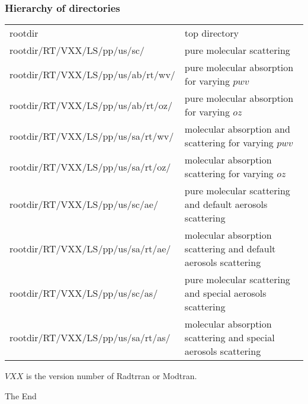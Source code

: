 \documentclass{beamer}
\begin{document}
\begin{frame}
\frametitle{Hierarchy of directories}
\begin{table}
{\tiny
\begin{tabular}{ l l}
  rootdir &  top directory \\
 rootdir/RT/VXX/LS/pp/us/sc/ & pure molecular scattering \\
 rootdir/RT/VXX/LS/pp/us/ab/rt/wv/ & pure molecular absorption for varying $pwv$ \\
 rootdir/RT/VXX/LS/pp/us/ab/rt/oz/ & pure molecular absorption for varying $oz$ \\
 rootdir/RT/VXX/LS/pp/us/sa/rt/wv/ & molecular absorption and scattering for varying $pwv$ \\
 rootdir/RT/VXX/LS/pp/us/sa/rt/oz/ & molecular absorption scattering for varying $oz$ \\
 rootdir/RT/VXX/LS/pp/us/sc/ae/ & pure molecular scattering and default aerosols scattering \\
 rootdir/RT/VXX/LS/pp/us/sa/rt/ae/ & molecular absorption scattering and default aerosols scattering \\
 rootdir/RT/VXX/LS/pp/us/sc/as/ & pure molecular scattering and special aerosols scattering \\
 rootdir/RT/VXX/LS/pp/us/sa/rt/as/ & molecular absorption scattering and special aerosols scattering \\
\end{tabular}
}
\end{table}
$VXX$ is the version number of Radtrran or Modtran.
\end{frame}




\begin{frame}
\Huge{\centerline{The End}}

\end{frame}

\end{document}
